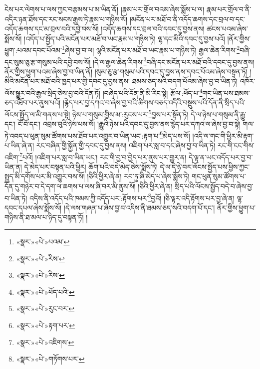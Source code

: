 ངེས་པར་ལེགས་པ་ལས་ཀྱང་བརྩམས་པ་མ་ཡིན་ནོ། །རྣམ་པར་གྲོལ་བའམ་ཞེས་སྨོས་པ་ལ། རྣམ་པར་གྲོལ་བ་ནི་འདིར་ཉན་ཐོས་དང་རང་སངས་རྒྱས་ཏེ་རྣམ་པ་གཉིས་སོ། །མངོན་པར་མཐོ་བ་ནི་འདོད་ཆགས་དང་བྲལ་བ་དང་འདོད་ཆགས་དང་མ་བྲལ་བའི་དབྱེ་བས་སོ། །འདོད་ཆགས་དང་བྲལ་བའི་དབང་དུ་བྱས་ནས། ཚངས་པའམ་ཞེས་སྨོས་སོ། །འདོད་པ་སྤྱོད་པའི་མངོན་པར་མཐོ་བ་ཡང་རྣམ་པ་གཉིས་ཏེ། ལྷ་དང་མིའི་དབང་དུ་བྱས་པའོ། །ནོར་གྱིས་ཕྱུག་:པའམ་དབང་པོའམ་\footnote{«སྣར་»«པེ་»པའམ་}ཞེས་བྱ་བ་ལ། ལྷའི་མངོན་པར་མཐོ་བ་ཡང་རྣམ་པ་གཉིས་ཏེ། རྒྱལ་ཆེན་རིགས་\footnote{«སྣར་»«པེ་»རིས་}བཞི་དང་སུམ་ཅུ་རྩ་གསུམ་པའི་དབྱེ་བས་སོ། །དེ་ལ་རྒྱལ་ཆེན་རིགས་\footnote{«སྣར་»«པེ་»རིས་}བཞི་དང་མངོན་པར་མཐོ་བའི་དབང་དུ་བྱས་ནས། ནོར་གྱིས་ཕྱུག་པའམ་ཞེས་བྱ་བ་ཡིན་ནོ། །སུམ་ཅུ་རྩ་གསུམ་པའི་དབང་དུ་བྱས་ནས་དབང་པོའམ་ཞེས་བསྟན་ཏོ། །མིའི་མངོན་པར་མཐོ་བའི་ཁྱད་པར་གྱི་དབང་དུ་བྱས་ནས། ཐམས་ཅད་སའི་བདག་པོའམ་ཞེས་བྱ་བ་ཡིན་ཏེ། འཁོར་ལོས་སྒྱུར་བའི་རྒྱལ་སྲིད་ཅེས་བྱ་བའི་དོན་ཏོ། །བཞེད་པའི་དོན་ནི་མི་རིང་སྟེ། རྩོལ་:ཕོད་པ་\footnote{«སྣར་»«པེ་»ཕོད་པའི་}གང་ཡིན་པས་ཐམས་ཅད་འཐོབ་པར་ནུས་པའོ། །རྙེད་པར་བྱ་དཀའ་བ་ཞེས་བྱ་བའི་ཚིགས་བཅད་འདིའི་བསྡུས་པའི་དོན་ནི་སྲིད་པའི་ལོངས་སྤྱོད་ལ་མི་གནས་པ་སྟེ། ཉེས་པ་གསུམ་གྱིས་མ་:རུངས་པར་\footnote{«སྣར་»«པེ་»རུང་བར་}བྱས་པར་སྟོན་ཏེ། དེ་ལ་ཉེས་པ་གསུམ་ནི་རྒྱུ་དང་། ངོ་བོ་དང་། འབྲས་བུའི་ཉེས་པས་སོ། །རྒྱུའི་ཉེས་པའི་དབང་དུ་བྱས་ནས་རྙེད་པར་དཀའ་ལ་ཞེས་བྱ་བ་སྟེ། གལ་ཏེ་འབད་པ་ཕུན་སུམ་ཚོགས་པས་ཐོབ་པར་འགྱུར་བ་ཡིན་ཡང་:རྟག་པ་\footnote{«སྣར་»«པེ་»རྟག་པར་}མེད་པས་སོ། །འདི་ལ་གང་གི་ཕྱིར་མི་རྟག་པ་ཡིན་ཞེ་ན། རང་བཞིན་གྱི་སྐྱོན་གྱི་དབང་དུ་བྱས་ནས། འཇིག་པར་སླ་བ་དང་ཞེས་བྱ་བ་ཡིན་ཏེ། རང་གི་ངང་གིས་འཇིག་\footnote{«སྣར་»«པེ་»འཇིགས་}པའོ། །འཇིག་པར་སླ་བ་ཡིན་ཡང་། རང་གི་བྱ་བ་བྱེད་པར་ནུས་པར་གྱུར་ན། དེ་ལྟ་ན་ཡང་འདོད་པར་བྱ་བ་ཡིན་ན། དེ་མེད་པར་བསྟན་པའི་ཕྱིར། ཆོག་པའི་བདེ་མེད་ཅེས་སྨོས་ཏེ། དེ་ལ་དེ་ཉེ་བར་ལོངས་སྤྱོད་པས་ཕྱིས་ཀྱང་སྤྱད་མི་དགོས་པར་མི་འགྱུར་བས་སོ། །ཅིའི་ཕྱིར་ཞེ་ན། རབ་ཏུ་ཞི་མེད་པ་ཞེས་སྨོས་ཏེ། གང་ཕུན་སུམ་ཚོགས་པ་དོན་དུ་གཉེར་བ་དེ་དག་ལ་ཆགས་པ་ལས་ཞི་བར་མི་ནུས་སོ། །ཅིའི་ཕྱིར་ཞེ་ན། སྲིད་པའི་ལོངས་སྤྱོད་བདེ་བ་ཞེས་བྱ་བ་ཡིན་ཏེ། འདིས་ནི་འདོད་པའི་ཁམས་ཀྱི་འདོད་པར་:རྟོགས་པར་\footnote{«སྣར་»«པེ་»གཏོགས་པར་}བྱའོ། །ཅི་ལྟར་འདི་རྟོགས་པར་བྱ་ཞེ་ན། ལྷ་དབང་དཔལ་ཞེས་སྨོས་སོ། །དེ་ལས་གཞན་པ་ཞེས་བྱ་བ་འདིས་ནི་ཐམས་ཅད་སའི་བདག་པོ་དང་། ནོར་གྱིས་ཕྱུག་པ་གཉིས་ནི་ཐ་མལ་པ་ཉིད་དུ་བསྟན་ཏོ། །
